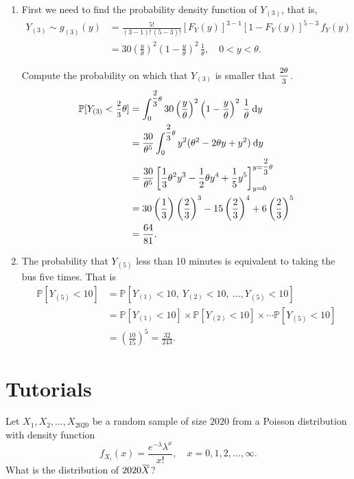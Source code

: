 \begin{solution}
\begin{enumerate}
    \item First we need to find the probability density function of $Y_{(3)}$, that is,
    \begin{align*}
        Y_{(3)} \sim g_{(3)}(y) &= \frac{5!}{(3-1)!\, (5-3)!} [F_Y(y)]^{3-1} [1 - F_Y(y)]^{5-3}\, f_Y(y)\\
        &= 30 \left( \frac{y}{\theta} \right)^2 \left(1 - \frac{y}{\theta} \right)^2\, \frac{1}{\theta}, \quad 0 < y < \theta.
    \end{align*}

    Compute the probability on which that $Y_{(3)}$ is smaller that $\mfrac{2\theta}{3}$.
    \begin{align*}
        \mathbb{P}[Y_{(3)} < \mfrac{2}{3}\theta] &= \int_{0}^{\mfrac{2}{3}\theta} 30 \left( \frac{y}{\theta} \right)^2 \left(1 - \frac{y}{\theta} \right)^2\, \frac{1}{\theta} \> \mathrm{d}y\\
        &= \frac{30}{\theta^5} \int_{0}^{\mfrac{2}{3}\theta} y^2 (\theta^2 - 2\theta y + y^2) \> \mathrm{d}y\\
        &= \frac{30}{\theta^5} \left[ \frac{1}{3}\theta^2 y^3 - \frac{1}{2}\theta y^4 + \frac{1}{5}y^5 \right]^{y=\mfrac{2}{3}\theta}_{y=0}\\
        &= 30 \left(\frac{1}{3}\right) \left(\frac{2}{3}\right)^3 - 15 \left(\frac{2}{3}\right)^4 + 6\left(\frac{2}{3}\right)^5\\
        &= \frac{64}{81}.
    \end{align*}

    \item The probability that $Y_{(5)}$ less than 10 minutes is equivalent to 
        taking the bus five times. That is 
        \begin{align*}
            \mathbb{P}[Y_{(5)} < 10] &= \mathbb{P}[Y_{(1)} < 10,\> Y_{(2)} < 10,\> \ldots, Y_{(5)} < 10]\\
            &= \mathbb{P}[Y_{(1)} < 10] \times \mathbb{P}[Y_{(2)} < 10] \times \cdots \mathbb{P}[Y_{(5)} < 10]\\
            &= \left( \frac{10}{15} \right)^5
            = \frac{32}{243}.
        \end{align*}
    \end{enumerate}
\end{solution}

\section*{Tutorials}

\begin{mdframed}
    \vspace{-0.25cm}
    \hspace{-0.25cm}
    \begin{Exercise}
        Let $X_1, X_2, \ldots, X_{2020}$ be a random sample of size $2020$ 
        from a Poisson distribution with density function
        \[
            f_{X_i}(x) = \frac{e^{-\lambda} \lambda^x}{x!}, \quad x = 0,1,2,\ldots,\infty.
        \]
        What is the distribution of $2020 \ols{X}$?
    \end{Exercise}
\end{mdframed}
